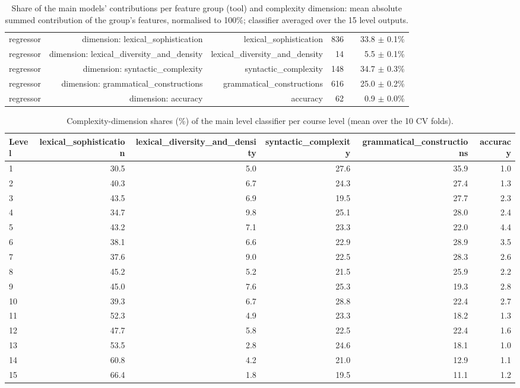 \begin{table}[t]
\begin{tabular}{lrrrrr}
regressor & dimension: lexical\_sophistication & lexical\_sophistication & 836 &  & 33.8 $\pm$ 0.1\% \\
regressor & dimension: lexical\_diversity\_and\_density & lexical\_diversity\_and\_density & 14 &  & 5.5 $\pm$ 0.1\% \\
regressor & dimension: syntactic\_complexity & syntactic\_complexity & 148 &  & 34.7 $\pm$ 0.3\% \\
regressor & dimension: grammatical\_constructions & grammatical\_constructions & 616 &  & 25.0 $\pm$ 0.2\% \\
regressor & dimension: accuracy & accuracy & 62 &  & 0.9 $\pm$ 0.0\% \\
\bottomrule
\end{tabular}
\caption{Share of the main models' contributions per feature group (tool) and complexity dimension: mean absolute summed contribution of the group's features, normalised to 100\%; classifier averaged over the 15 level outputs.}
\label{tab:table_6_group_importance}
\end{table}

\begin{table}[t]
\centering
\small
\begin{tabular}{lrrrrr}
\toprule
Level & lexical\_sophistication & lexical\_diversity\_and\_density & syntactic\_complexity & grammatical\_constructions & accuracy \\
\midrule
1 & 30.5 & 5.0 & 27.6 & 35.9 & 1.0 \\
2 & 40.3 & 6.7 & 24.3 & 27.4 & 1.3 \\
3 & 43.5 & 6.9 & 19.5 & 27.7 & 2.3 \\
4 & 34.7 & 9.8 & 25.1 & 28.0 & 2.4 \\
5 & 43.2 & 7.1 & 23.3 & 22.0 & 4.4 \\
6 & 38.1 & 6.6 & 22.9 & 28.9 & 3.5 \\
7 & 37.6 & 9.0 & 22.5 & 28.3 & 2.6 \\
8 & 45.2 & 5.2 & 21.5 & 25.9 & 2.2 \\
9 & 45.0 & 7.6 & 25.3 & 19.3 & 2.8 \\
10 & 39.3 & 6.7 & 28.8 & 22.4 & 2.7 \\
11 & 52.3 & 4.9 & 23.3 & 18.2 & 1.3 \\
12 & 47.7 & 5.8 & 22.5 & 22.4 & 1.6 \\
13 & 53.5 & 2.8 & 24.6 & 18.1 & 1.0 \\
14 & 60.8 & 4.2 & 21.0 & 12.9 & 1.1 \\
15 & 66.4 & 1.8 & 19.5 & 11.1 & 1.2 \\
\bottomrule
\end{tabular}
\caption{Complexity-dimension shares (\%) of the main level classifier per course level (mean over the 10 CV folds).}
\label{tab:table_6b_dimension_shares_by_level}
\end{table}

